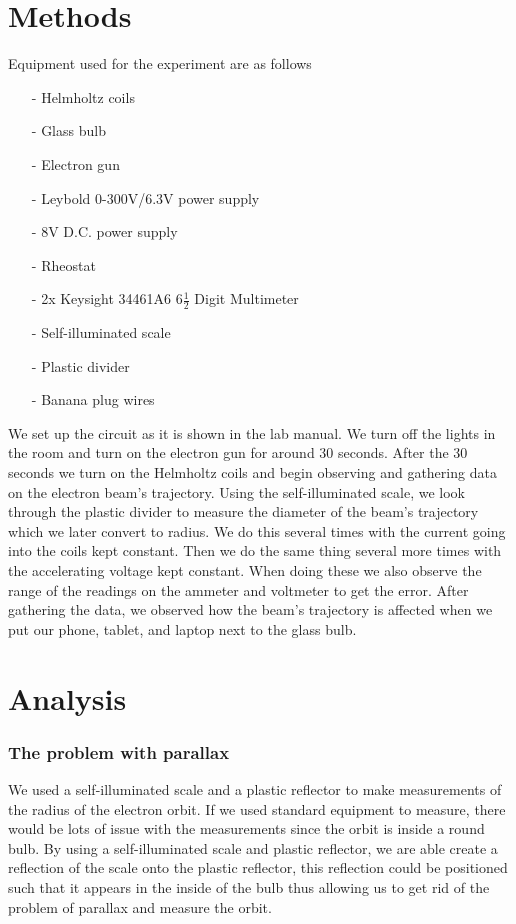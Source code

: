 \documentclass{article}
\begin{document}
\section{Methods}
Equipment used for the experiment are as follows
\begin{itemize}
    \item[-] Helmholtz coils
    \item[-] Glass bulb
    \item[-] Electron gun
    \item[-] Leybold 0-300V/6.3V power supply
    \item[-] 8V D.C. power supply
    \item[-] Rheostat
    \item[-] 2x Keysight 34461A6 6$\frac{1}{2}$ Digit Multimeter
    \item[-] Self-illuminated scale
    \item[-] Plastic divider
    \item[-] Banana plug wires
\end{itemize}
We set up the circuit as it is shown in the lab manual.  We turn off the lights
in the room and turn on the electron gun for around 30 seconds.  After the 30
seconds we turn on the Helmholtz coils and begin observing and gathering data on the
electron beam's trajectory.  Using the self-illuminated scale, we look through the 
plastic divider to measure the diameter of the beam's trajectory which we later 
convert to radius.  We do this several times with the current going into the coils 
kept constant.  Then we do the same thing several more times with the accelerating 
voltage kept constant.  When doing these we also observe the range 
of the readings on the ammeter and voltmeter to get the error.  After gathering the 
data, we observed how the beam's trajectory is affected when we put our phone, tablet, 
and laptop next to the glass bulb.

\section{Analysis}
\subsubsection*{The problem with parallax}
We used a self-illuminated scale and a plastic reflector to make measurements
of the radius of the electron orbit. If we used standard equipment to measure,
there would be lots of issue with the measurements since the orbit is inside a
round bulb. By using a self-illuminated scale and plastic reflector, we are able
create a reflection of the scale onto the plastic reflector, this reflection
could be positioned such that it appears in the inside of the bulb thus allowing
us to get rid of the problem of parallax and measure the orbit.
\end{document}
